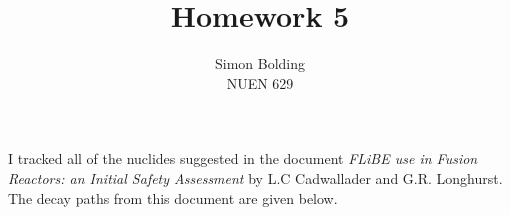 \documentclass[12pt]{article}
\newenvironment{solnum}[2][Solution]{\begin{trivlist}
\item[\hskip \labelsep {\bfseries #1}\hskip \labelsep {\bfseries #2:}]\hspace{0.3in}\newline\newline}{\end{trivlist}}
\begin{document}
 
 
\title{Homework 5}%
\author{Simon Bolding\\ %
NUEN 629} %
 
\maketitle

\clearpage



\begin{solnum}{1-1}

I tracked all of the nuclides suggested in the document \emph{FLiBE use in Fusion
Reactors: an Initial Safety Assessment} by L.C Cadwallader and G.R. Longhurst.  The decay paths from this
document are given below.  



\end{solnum}
\clearpage
\end{document}
